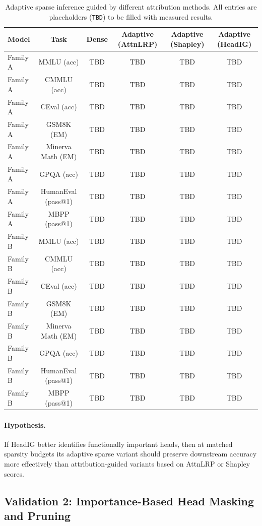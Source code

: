 \begin{table}[t]
\centering
\caption{Adaptive sparse inference guided by different attribution methods. All entries are placeholders (\texttt{TBD}) to be filled with measured results.}
\label{tab:adaptive_main}
\begin{tabular}{lccccc}
\hline
\textbf{Model} & \textbf{Task} & \textbf{Dense} & \textbf{Adaptive (AttnLRP)} & \textbf{Adaptive (Shapley)} & \textbf{Adaptive (HeadIG)} \\
\hline
Family A & MMLU (acc) & TBD & TBD & TBD & TBD \\
Family A & CMMLU (acc) & TBD & TBD & TBD & TBD \\
Family A & CEval (acc) & TBD & TBD & TBD & TBD \\
Family A & GSM8K (EM) & TBD & TBD & TBD & TBD \\
Family A & Minerva Math (EM) & TBD & TBD & TBD & TBD \\
Family A & GPQA (acc) & TBD & TBD & TBD & TBD \\
Family A & HumanEval (pass@1) & TBD & TBD & TBD & TBD \\
Family A & MBPP (pass@1) & TBD & TBD & TBD & TBD \\
Family B & MMLU (acc) & TBD & TBD & TBD & TBD \\
Family B & CMMLU (acc) & TBD & TBD & TBD & TBD \\
Family B & CEval (acc) & TBD & TBD & TBD & TBD \\
Family B & GSM8K (EM) & TBD & TBD & TBD & TBD \\
Family B & Minerva Math (EM) & TBD & TBD & TBD & TBD \\
Family B & GPQA (acc) & TBD & TBD & TBD & TBD \\
Family B & HumanEval (pass@1) & TBD & TBD & TBD & TBD \\
Family B & MBPP (pass@1) & TBD & TBD & TBD & TBD \\
\hline
\end{tabular}
\end{table}

\paragraph{Hypothesis.}
If HeadIG better identifies functionally important heads, then at matched sparsity budgets its adaptive sparse variant should preserve downstream accuracy more effectively than attribution-guided variants based on AttnLRP or Shapley scores.

\subsection{Validation 2: Importance-Based Head Masking and Pruning}
\label{sec:exp:masking}

